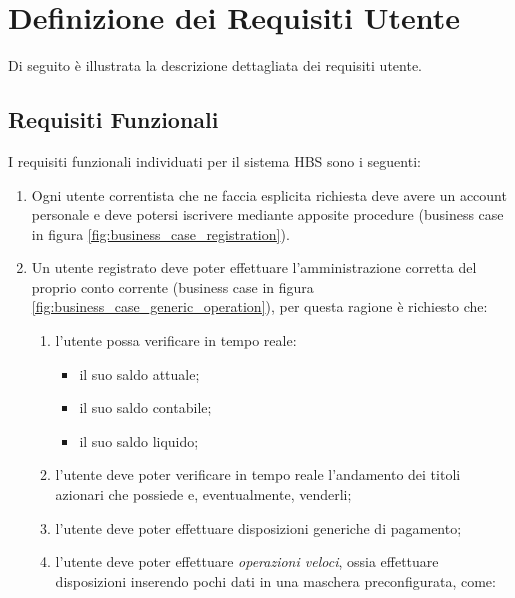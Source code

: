 
\section{Definizione dei Requisiti Utente}

Di seguito \`e illustrata la descrizione dettagliata dei requisiti utente.

\subsection{Requisiti Funzionali}
\label{sec:utente:funzionali}

I requisiti funzionali individuati per il sistema HBS sono i seguenti:

\begin{enumerate}
	\item \label{itm:utente:funzionali:iscrizione} Ogni utente correntista che ne faccia esplicita richiesta deve avere un account personale e deve potersi iscrivere  mediante apposite procedure (business case in figura \ref{fig:business_case_registration}).
	\item \label{itm:utente:funzionali:gestione-conto} Un utente registrato deve poter effettuare l'amministrazione corretta del proprio conto corrente (business case in figura \ref{fig:business_case_generic_operation}), per questa ragione è richiesto che:
	\begin{enumerate}
		\item \label{itm:utente:funzionali:gestione-conto:verifica-saldo} l'utente possa verificare in tempo reale:
			\begin{itemize}
				\item il suo saldo attuale;
				\item il suo saldo contabile;
				\item il suo saldo liquido;
			\end{itemize}
		\item \label{itm:utente:funzionali:gestione-conto:verifica-andamento} l'utente deve poter verificare in tempo reale l'andamento dei titoli azionari che possiede e, eventualmente, venderli;
		\item \label{itm:utente:funzionali:gestione-conto:operazioni} l'utente deve poter effettuare disposizioni generiche di pagamento;
		\item \label{itm:utente:funzionali:gestione-conto:operazioni-veloci} l'utente deve poter effettuare \emph{operazioni veloci}, ossia effettuare disposizioni inserendo pochi dati in una maschera preconfigurata, come:

\end{enumerate}
\end{enumerate}
